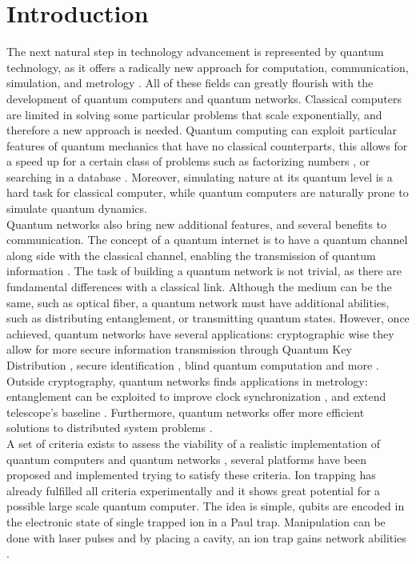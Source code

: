 \documentclass[english, a4paper, 12pt, twoside]{book}
\numberwithin{equation}{section} %
\begin{document}
\chapter{Introduction} %
The next natural step in technology advancement is represented by quantum technology, as it offers a radically new approach for computation, communication, simulation, and metrology \cite{quantumtech}. All of these fields can greatly flourish with the development of quantum computers and quantum networks. Classical computers are limited in solving some particular problems that scale exponentially, and therefore a new approach is needed. Quantum computing can exploit particular features of quantum mechanics that have no classical counterparts, this allows for a speed up for a certain class of problems such as factorizing numbers \cite{shor}, or searching in a database \cite{grover}. Moreover, simulating nature at its quantum level is a hard task for classical computer, while quantum computers are naturally prone to simulate quantum dynamics.\\
Quantum networks also bring new additional features, and several benefits to communication. The concept of a quantum internet is to have a quantum channel along side with the classical channel, enabling the transmission of quantum information \cite{Wehnereaam9288}. The task of building a quantum network is not trivial, as there are fundamental differences with a classical link. Although the medium can be the same, such as optical fiber, a quantum network must have additional abilities, such as distributing entanglement, or transmitting quantum states. However, once achieved, quantum networks have several applications: cryptographic wise they allow for more secure information transmission through Quantum Key Distribution \cite{qkd2}, secure identification \cite{secureident}, blind quantum computation \cite{blindcomputation} and more \cite{Wehnereaam9288}. Outside cryptography, quantum networks finds applications in metrology: entanglement can be exploited to improve clock synchronization \cite{quantumclocks},
and extend telescope's baseline  \cite{telescope}. Furthermore, quantum networks offer more efficient solutions to distributed system problems \cite{distributedcomputing}.\\
A set of criteria exists to assess the viability of a realistic implementation of quantum computers and quantum networks \cite{divincenzo}, several platforms have been proposed and implemented trying to satisfy these criteria. Ion trapping has already fulfilled all criteria experimentally \cite{trappedions} and it shows great potential for a possible large scale quantum computer. The idea is simple, qubits are encoded in the electronic state of single trapped ion in a Paul trap. Manipulation can be done with laser pulses \cite{ionquantumcomputer} and by placing a cavity, an ion trap gains network abilities \cite{stuteinterface}.\\
\end{document}
